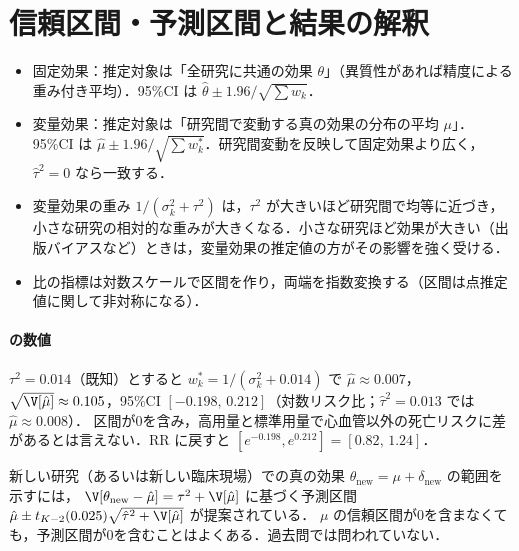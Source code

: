 \section{信頼区間・予測区間と結果の解釈}\label{sec:18-interp}
\Hinshutsu
\begin{itemize}
\item 固定効果：推定対象は「全研究に共通の効果 $\theta$」（異質性があれば精度による重み付き平均）．95\%CI は $\hat\theta\pm1.96/\sqrt{\sum w_k}$．
\item 変量効果：推定対象は「研究間で変動する真の効果の分布の平均 $\mu$」．95\%CI は $\hat\mu\pm1.96/\sqrt{\sum w_k^*}$．研究間変動を反映して固定効果より広く，$\hat\tau^2=0$ なら一致する．
\item 変量効果の重み $1/(\sigma_k^2+\tau^2)$ は，$\tau^2$ が大きいほど研究間で均等に近づき，小さな研究の相対的な重みが大きくなる．小さな研究ほど効果が大きい（出版バイアスなど）ときは，変量効果の推定値の方がその影響を強く受ける．
\item 比の指標は対数スケールで区間を作り，両端を指数変換する（区間は点推定値に関して非対称になる）．
\end{itemize}
\paragraph{ の数値}
$\tau^2=0.014$（既知）とすると $w_k^*=1/(\sigma_k^2+0.014)$ で $\hat\mu\approx0.007$，$\sqrt{\V[\hat\mu]}\approx0.105$，95\%CI $[-0.198,\,0.212]$（対数リスク比；$\hat\tau^2=0.013$ では $\hat\mu\approx0.008$）．
区間が0を含み，高用量と標準用量で心血管以外の死亡リスクに差があるとは言えない．RR に戻すと $[e^{-0.198},e^{0.212}]=[0.82,\,1.24]$．

\begin{supbox}
新しい研究（あるいは新しい臨床現場）での真の効果 $\theta_{\mathrm{new}}=\mu+\delta_{\mathrm{new}}$ の範囲を示すには，
$\V[\theta_{\mathrm{new}}-\hat\mu]=\tau^2+\V[\hat\mu]$ に基づく予測区間 $\hat\mu\pm t_{K-2}(0.025)\sqrt{\hat\tau^2+\V[\hat\mu]}$ が提案されている．
$\mu$ の信頼区間が0を含まなくても，予測区間が0を含むことはよくある．過去問では問われていない．
\end{supbox}

